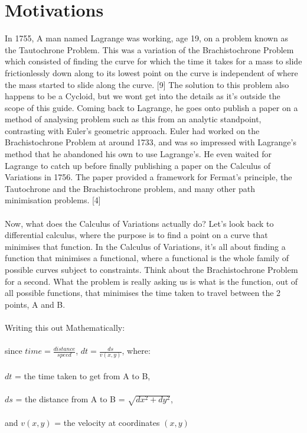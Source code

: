 \documentclass[12pt]{report}
\begin{document}
\section{Motivations}
In 1755, A man named Lagrange was working, age 19, on a problem known as the Tautochrone Problem. This was a variation of the Brachistochrone Problem which consisted of finding the curve for which the time it takes for a mass to slide frictionlessly down along to its lowest point on the curve is independent of where the mass started to slide along the curve. [9] The solution to this problem also happens to be a Cycloid, but we wont get into the details as it's outside the scope of this guide. Coming back to Lagrange, he goes onto publish a paper on a method of analysing problem such as this from an analytic standpoint, contrasting with Euler's geometric approach. Euler had worked on the Brachistochrone Problem at around 1733, and was so impressed with Lagrange's method that he abandoned his own to use Lagrange's. He even waited for Lagrange to catch up before finally publishing a paper on the Calculus of Variations in 1756. The paper provided a framework for Fermat's principle, the Tautochrone and the Brachistochrone problem, and many other path minimisation problems. [4]
\\
\\
Now, what does the Calculus of Variations actually do? Let's look back to differential calculus, where the purpose is to find a point on a curve that minimises that function. In the Calculus of Variations, it's all about finding a function that minimises a functional, where a functional is the whole family of possible curves subject to constraints. Think about the Brachistochrone Problem for a second. What the problem is really asking us is what is the function, out of all possible functions, that minimises the time taken to travel between the 2 points, A and B.
\\
\\
Writing this out Mathematically:
\\
\\
since \(time=\frac{distance}{speed}\), \(dt=\frac{ds}{v(x,y)}\), where:
\\
\\
\(dt\) = the time taken to get from A to B,
\\
\\
\(ds\) = the distance from A to B = \(\sqrt{dx^2 + dy^2}\),
\\
\\
and \(v(x,y)\) = the velocity at coordinates \((x,y)\)
\end{document}

